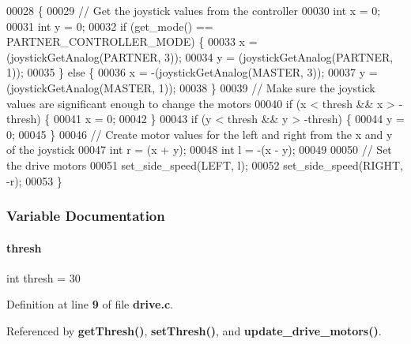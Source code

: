 \begin{DoxyCode}
00028                            \{
00029   \textcolor{comment}{// Get the joystick values from the controller}
00030   \textcolor{keywordtype}{int} x = 0;
00031   \textcolor{keywordtype}{int} y = 0;
00032   \textcolor{keywordflow}{if} (get_mode() == PARTNER_CONTROLLER_MODE) \{
00033     x = (joystickGetAnalog(PARTNER, 3));
00034     y = (joystickGetAnalog(PARTNER, 1));
00035   \} \textcolor{keywordflow}{else} \{
00036     x = -(joystickGetAnalog(MASTER, 3));
00037     y = (joystickGetAnalog(MASTER, 1));
00038   \}
00039   \textcolor{comment}{// Make sure the joystick values are significant enough to change the motors}
00040   \textcolor{keywordflow}{if} (x < thresh && x > -thresh) \{
00041     x = 0;
00042   \}
00043   \textcolor{keywordflow}{if} (y < thresh && y > -thresh) \{
00044     y = 0;
00045   \}
00046   \textcolor{comment}{// Create motor values for the left and right from the x and y of the joystick}
00047   \textcolor{keywordtype}{int} r = (x + y);
00048   \textcolor{keywordtype}{int} l = -(x - y);
00049 
00050   \textcolor{comment}{// Set the drive motors}
00051   set_side_speed(LEFT, l);
00052   set_side_speed(RIGHT, -r);
00053 \}
\end{DoxyCode}


\subsubsection{Variable Documentation}
\mbox{\label{a00092_a6cf8bf160a02413bc3d5d18b0294b581}} 
\paragraph{thresh}
{\footnotesize\ttfamily int thresh = 30\hspace{0.3cm}{\ttfamily [static]}}



Definition at line \textbf{ 9} of file \textbf{ drive.\+c}.



Referenced by \textbf{ get\+Thresh()}, \textbf{ set\+Thresh()}, and \textbf{ update\+\_\+drive\+\_\+motors()}.

